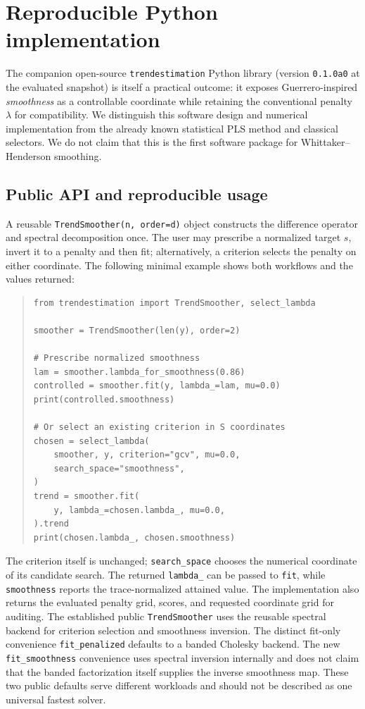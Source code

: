 \section{Reproducible Python implementation}
\label{sec:expanded-software}
The companion open-source \texttt{trendestimation} Python library
(version \texttt{0.1.0a0} at the evaluated snapshot) is itself
a practical outcome: it exposes Guerrero-inspired \emph{smoothness}
as a controllable coordinate while retaining the conventional
penalty $\lambda$ for compatibility. We distinguish this
software design and numerical implementation from the already
known statistical PLS method and classical selectors.
We do not claim that this is the first software package for
Whittaker--Henderson smoothing.

\subsection{Public API and reproducible usage}
A reusable \texttt{TrendSmoother(n, order=d)} object constructs
the difference operator and spectral decomposition once.
The user may prescribe a normalized target $s$, invert it to
a penalty and then fit; alternatively, a criterion selects
the penalty on either coordinate. The following minimal
example shows both workflows and the values returned:
\begin{quote}
\begin{verbatim}
from trendestimation import TrendSmoother, select_lambda

smoother = TrendSmoother(len(y), order=2)

# Prescribe normalized smoothness
lam = smoother.lambda_for_smoothness(0.86)
controlled = smoother.fit(y, lambda_=lam, mu=0.0)
print(controlled.smoothness)

# Or select an existing criterion in S coordinates
chosen = select_lambda(
    smoother, y, criterion="gcv", mu=0.0,
    search_space="smoothness",
)
trend = smoother.fit(
    y, lambda_=chosen.lambda_, mu=0.0,
).trend
print(chosen.lambda_, chosen.smoothness)
\end{verbatim}
\end{quote}
The criterion itself is unchanged; \texttt{search\_space}
chooses the numerical coordinate of its candidate search.
The returned \texttt{lambda\_} can be passed to
\texttt{fit}, while \texttt{smoothness} reports the
trace-normalized attained value. The implementation
also returns the evaluated penalty grid, scores, and
requested coordinate grid for auditing.
The established public \texttt{TrendSmoother} uses
the reusable spectral backend for criterion selection and
smoothness inversion. The distinct fit-only convenience
\texttt{fit\_penalized} defaults to a banded Cholesky backend.
The new \texttt{fit\_smoothness} convenience uses spectral
inversion internally and does not claim that the banded
factorization itself supplies the inverse smoothness map.
These two public defaults serve different workloads and
should not be described as one universal fastest solver.

